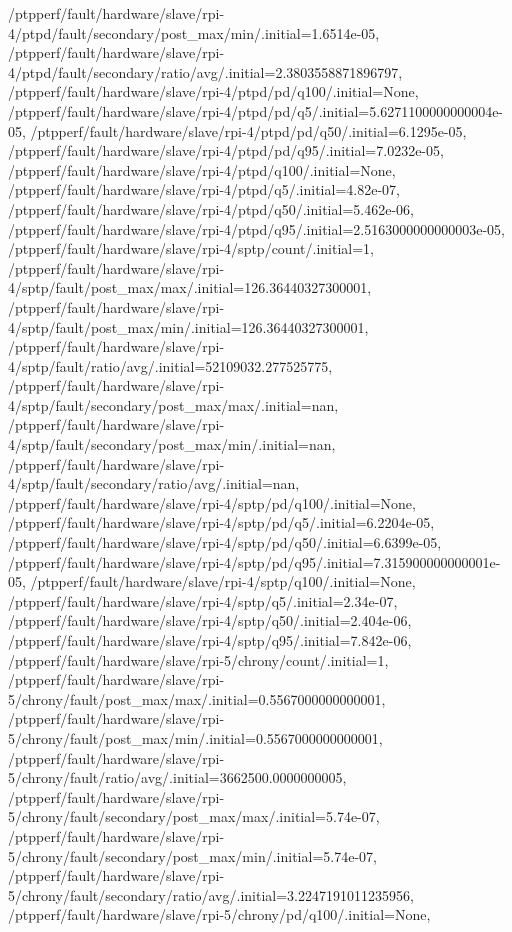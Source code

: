 {    /ptpperf/fault/hardware/slave/rpi-4/ptpd/fault/secondary/post_max/min/.initial=1.6514e-05,
    /ptpperf/fault/hardware/slave/rpi-4/ptpd/fault/secondary/ratio/avg/.initial=2.3803558871896797,
    /ptpperf/fault/hardware/slave/rpi-4/ptpd/pd/q100/.initial=None,
    /ptpperf/fault/hardware/slave/rpi-4/ptpd/pd/q5/.initial=5.6271100000000004e-05,
    /ptpperf/fault/hardware/slave/rpi-4/ptpd/pd/q50/.initial=6.1295e-05,
    /ptpperf/fault/hardware/slave/rpi-4/ptpd/pd/q95/.initial=7.0232e-05,
    /ptpperf/fault/hardware/slave/rpi-4/ptpd/q100/.initial=None,
    /ptpperf/fault/hardware/slave/rpi-4/ptpd/q5/.initial=4.82e-07,
    /ptpperf/fault/hardware/slave/rpi-4/ptpd/q50/.initial=5.462e-06,
    /ptpperf/fault/hardware/slave/rpi-4/ptpd/q95/.initial=2.5163000000000003e-05,
    /ptpperf/fault/hardware/slave/rpi-4/sptp/count/.initial=1,
    /ptpperf/fault/hardware/slave/rpi-4/sptp/fault/post_max/max/.initial=126.36440327300001,
    /ptpperf/fault/hardware/slave/rpi-4/sptp/fault/post_max/min/.initial=126.36440327300001,
    /ptpperf/fault/hardware/slave/rpi-4/sptp/fault/ratio/avg/.initial=52109032.277525775,
    /ptpperf/fault/hardware/slave/rpi-4/sptp/fault/secondary/post_max/max/.initial=nan,
    /ptpperf/fault/hardware/slave/rpi-4/sptp/fault/secondary/post_max/min/.initial=nan,
    /ptpperf/fault/hardware/slave/rpi-4/sptp/fault/secondary/ratio/avg/.initial=nan,
    /ptpperf/fault/hardware/slave/rpi-4/sptp/pd/q100/.initial=None,
    /ptpperf/fault/hardware/slave/rpi-4/sptp/pd/q5/.initial=6.2204e-05,
    /ptpperf/fault/hardware/slave/rpi-4/sptp/pd/q50/.initial=6.6399e-05,
    /ptpperf/fault/hardware/slave/rpi-4/sptp/pd/q95/.initial=7.315900000000001e-05,
    /ptpperf/fault/hardware/slave/rpi-4/sptp/q100/.initial=None,
    /ptpperf/fault/hardware/slave/rpi-4/sptp/q5/.initial=2.34e-07,
    /ptpperf/fault/hardware/slave/rpi-4/sptp/q50/.initial=2.404e-06,
    /ptpperf/fault/hardware/slave/rpi-4/sptp/q95/.initial=7.842e-06,
    /ptpperf/fault/hardware/slave/rpi-5/chrony/count/.initial=1,
    /ptpperf/fault/hardware/slave/rpi-5/chrony/fault/post_max/max/.initial=0.5567000000000001,
    /ptpperf/fault/hardware/slave/rpi-5/chrony/fault/post_max/min/.initial=0.5567000000000001,
    /ptpperf/fault/hardware/slave/rpi-5/chrony/fault/ratio/avg/.initial=3662500.0000000005,
    /ptpperf/fault/hardware/slave/rpi-5/chrony/fault/secondary/post_max/max/.initial=5.74e-07,
    /ptpperf/fault/hardware/slave/rpi-5/chrony/fault/secondary/post_max/min/.initial=5.74e-07,
    /ptpperf/fault/hardware/slave/rpi-5/chrony/fault/secondary/ratio/avg/.initial=3.2247191011235956,
    /ptpperf/fault/hardware/slave/rpi-5/chrony/pd/q100/.initial=None,
}
